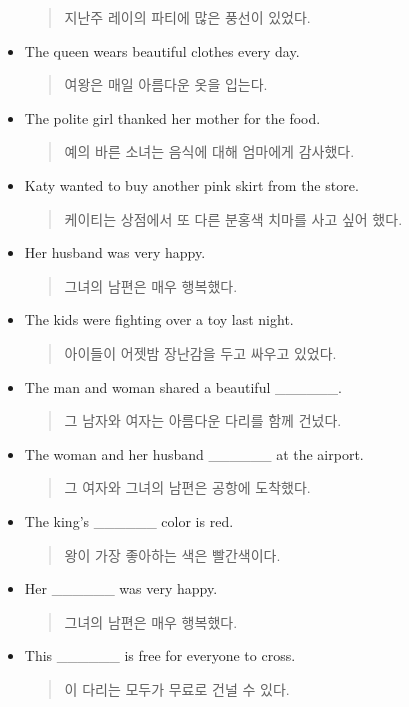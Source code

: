 \documentclass{article}
\begin{document}
\begin{addmargin}[1em]{1em}
\begin{itemize}
\begin{quote}
    지난주 레이의 파티에 많은 풍선이 있었다.
    \end{quote}
    \item The queen wears beautiful clothes every day.
    \begin{quote}
    여왕은 매일 아름다운 옷을 입는다.
    \end{quote}
    \item The polite girl thanked her mother for the food.
    \begin{quote}
    예의 바른 소녀는 음식에 대해 엄마에게 감사했다.
    \end{quote}
    \item Katy wanted to buy another pink skirt from the store.
    \begin{quote}
    케이티는 상점에서 또 다른 분홍색 치마를 사고 싶어 했다.
    \end{quote}
    \item Her husband was very happy.
    \begin{quote}
    그녀의 남편은 매우 행복했다.
    \end{quote}
    \item The kids were fighting over a toy last night.
    \begin{quote}
    아이들이 어젯밤 장난감을 두고 싸우고 있었다.
    \end{quote}
    \item The man and woman shared a beautiful \_\_\_\_\_\_.
    \begin{quote}
    그 남자와 여자는 아름다운 다리를 함께 건넜다.
    \end{quote}
    \item The woman and her husband \_\_\_\_\_\_ at the airport.
    \begin{quote}
    그 여자와 그녀의 남편은 공항에 도착했다.
    \end{quote}
    \item The king's \_\_\_\_\_\_ color is red.
    \begin{quote}
    왕이 가장 좋아하는 색은 빨간색이다.
    \end{quote}
    \item Her \_\_\_\_\_\_ was very happy.
    \begin{quote}
    그녀의 남편은 매우 행복했다.
    \end{quote}
    \item This \_\_\_\_\_\_ is free for everyone to cross.
    \begin{quote}
    이 다리는 모두가 무료로 건널 수 있다.
    \end{quote}

\end{itemize}
\end{addmargin}
\end{document}
